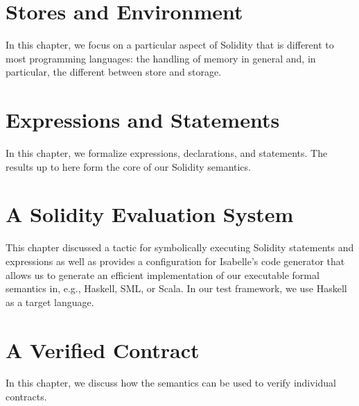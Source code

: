 \documentclass[10pt,DIV17,a4paper,abstract=true,twoside=semi,openright]
{scrreprt}
\begin{document}


\chapter{Stores and Environment}
In this chapter, we focus on a particular aspect of Solidity that is
different to most programming languages: the handling of memory in
general and, in particular, the different between store and storage.




\chapter{Expressions and Statements}

In this chapter, we formalize expressions, declarations, and
statements. The results up to here form the core of our Solidity
semantics. 




\chapter{A Solidity Evaluation System}
This chapter discussed a tactic for symbolically executing Solidity statements
and expressions as well as provides a configuration for Isabelle's code
generator that allows us to generate an efficient implementation of our
executable formal semantics in, e.g., Haskell, SML, or Scala. In our test
framework, we use Haskell as a target language.



\chapter{A Verified Contract}
In this chapter, we discuss how the semantics can be used to verify individual contracts.



\end{document}
